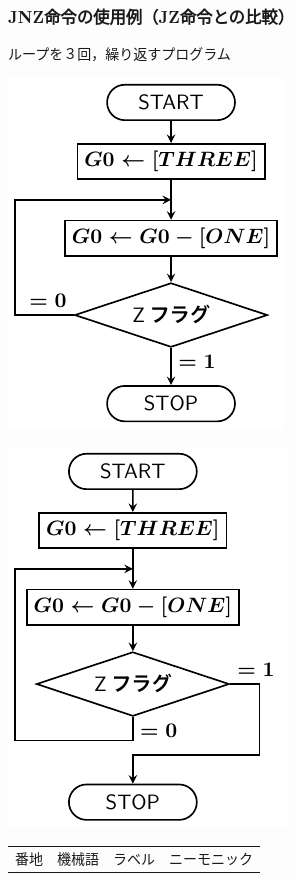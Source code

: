 \documentclass[handout]{beamer}        %
\begin{document}
\begin{frame}
  \frametitle{JNZ命令の使用例（JZ命令との比較）}
  ループを３回，繰り返すプログラム\\
  \vfill
  \begin{minipage}{0.4\columnwidth}
    \centerline{\includegraphics[scale=0.6]{../Tikz/flow0C.pdf}}
    \centerline{\includegraphics[scale=0.6]{../Tikz/flow0B.pdf}}
  \end{minipage}
  \begin{minipage}{0.59\columnwidth}
    {\ttfamily\footnotesize\begin{center}
      \begin{tabular}{|l|l|l|l l|} \hline
        番地 & 機械語 & ラベル & \multicolumn{2}{|c|}{ニーモニック} \\

\end{tabular}
\end{center}}
\end{minipage}
\end{frame}
\end{document}
